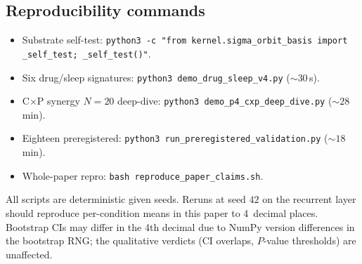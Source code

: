 \subsection{Reproducibility commands}

\begin{itemize}\itemsep=2pt
\item Substrate self-test:
  \texttt{python3 -c "from kernel.sigma\_orbit\_basis import \_self\_test; \_self\_test()"}.
\item Six drug/sleep signatures:
  \texttt{python3 demo\_drug\_sleep\_v4.py} ($\sim 30$\,s).
\item C$\times$P synergy $N\!=\!20$ deep-dive:
  \texttt{python3 demo\_p4\_cxp\_deep\_dive.py} ($\sim 28$\,min).
\item Eighteen preregistered:
  \texttt{python3 run\_preregistered\_validation.py}
  ($\sim 18$\,min).
\item Whole-paper repro:
  \texttt{bash reproduce\_paper\_claims.sh}.
\end{itemize}

All scripts are deterministic given seeds. Reruns at seed $42$ on the
recurrent layer should reproduce per-condition means in this paper to
4~decimal places. Bootstrap CIs may differ in the 4th decimal due to
NumPy version differences in the bootstrap RNG; the qualitative
verdicts (CI overlaps, $P$-value thresholds) are unaffected.
